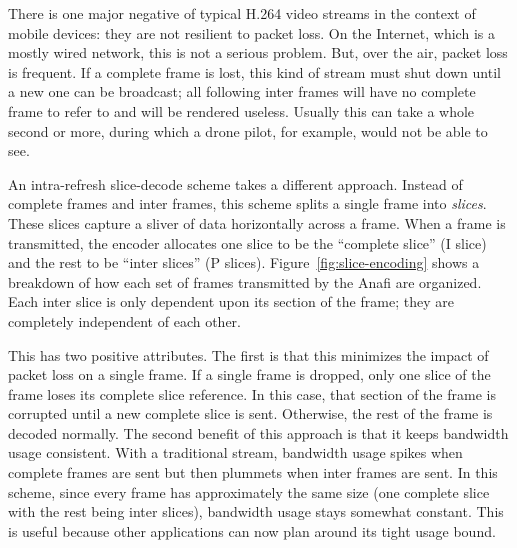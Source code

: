 There is one major negative of typical H.264 video streams in the context of mobile devices: they are not resilient to packet loss. On the Internet, which is a mostly wired network, this is not a serious problem. But, over the air, packet loss is frequent. If a complete frame is lost, this kind of stream must shut down until a new one can be broadcast; all following inter frames will have no complete frame to refer to and will be rendered useless. Usually this can take a whole second or more, during which a drone pilot, for example, would not be able to see.

An intra-refresh slice-decode scheme takes a different approach. Instead of complete frames and inter frames, this scheme splits a single frame into \textit{slices}. These slices capture a sliver of data horizontally across a frame. When a frame is transmitted, the encoder allocates one slice to be the ``complete slice'' (I slice) and the rest to be ``inter slices'' (P slices). Figure~\ref{fig:slice-encoding} shows a breakdown of how each set of frames transmitted by the Anafi are organized. Each inter slice is only dependent upon its section of the frame; they are completely independent of each other. 

This has two positive attributes. The first is that this minimizes the impact of packet loss on a single frame. If a single frame is dropped, only one slice of the frame loses its complete slice reference. In this case, that section of the frame is corrupted until a new complete slice is sent. Otherwise, the rest of the frame is decoded normally. The second benefit of this approach is that it keeps bandwidth usage consistent. With a traditional stream, bandwidth usage spikes when complete frames are sent but then plummets when inter frames are sent. In this scheme, since every frame has approximately the same size (one complete slice with the rest being inter slices), bandwidth usage stays somewhat constant. This is useful because other applications can now plan around its tight usage bound.

